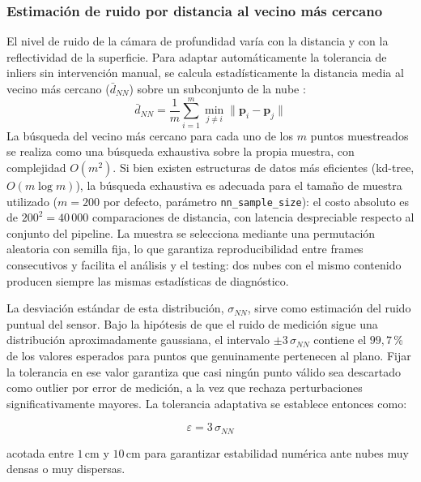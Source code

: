 \subsubsection{Estimación de ruido por distancia al vecino más cercano}
\label{subsec:lm-v3-noise}

El nivel de ruido de la cámara de profundidad varía con la distancia y con
la reflectividad de la superficie. Para adaptar automáticamente la tolerancia
de inliers sin intervención manual, se calcula estadísticamente la distancia
media al vecino más cercano ($\bar{d}_{NN}$) sobre un subconjunto de la
nube \cite{gonzalez2018digital}:
\begin{equation}
  \label{eq:nn-dist}
  \bar{d}_{NN} = \frac{1}{m} \sum_{i=1}^m \min_{j \neq i} \lVert \mathbf{p}_i - \mathbf{p}_j \rVert
\end{equation}
La búsqueda del vecino más cercano para cada uno de los $m$ puntos muestreados
se realiza como una búsqueda exhaustiva sobre la propia muestra, con
complejidad $O(m^2)$. Si bien existen estructuras de datos más eficientes
(kd-tree, $O(m \log m)$), la búsqueda exhaustiva es adecuada para el tamaño
de muestra utilizado ($m = 200$ por defecto, parámetro
\texttt{nn\_sample\_size}): el costo absoluto es de $200^2 = 40\,000$
comparaciones de distancia, con latencia despreciable respecto al conjunto
del pipeline. La muestra se selecciona mediante una permutación aleatoria
con semilla fija, lo que garantiza reproducibilidad entre frames consecutivos
y facilita el análisis y el testing: dos nubes con el mismo contenido producen
siempre las mismas estadísticas de diagnóstico.

La desviación estándar de esta distribución, $\sigma_{NN}$, sirve como
estimación del ruido puntual del sensor. Bajo la hipótesis de que el ruido
de medición sigue una distribución aproximadamente gaussiana, el intervalo
$\pm 3\,\sigma_{NN}$ contiene el $99{,}7\,$\% de los valores esperados para
puntos que genuinamente pertenecen al plano. Fijar la tolerancia en ese valor
garantiza que casi ningún punto válido sea descartado como outlier por error
de medición, a la vez que rechaza perturbaciones significativamente mayores.
La tolerancia adaptativa se establece entonces como:

\begin{equation}
  \label{eq:adaptive-tol}
  \varepsilon = 3 \, \sigma_{NN}
\end{equation}

acotada entre $1\,\text{cm}$ y $10\,\text{cm}$ para garantizar
estabilidad numérica ante nubes muy densas o muy dispersas.


